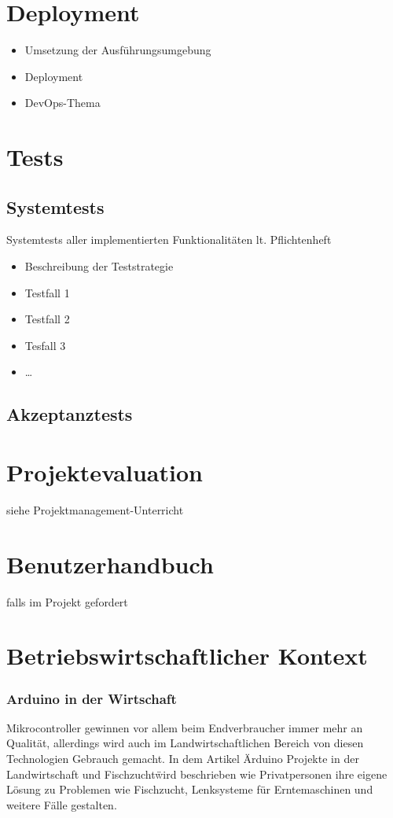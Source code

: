 \chapter{Deployment}
\begin{itemize}
	\item Umsetzung der Ausführungsumgebung
	\item Deployment
	\item DevOps-Thema
\end{itemize}

\chapter{Tests}

\section{Systemtests} 
Systemtests aller implementierten Funktionalitäten lt. Pflichtenheft
\begin{itemize}
	\item Beschreibung der Teststrategie
	\item Testfall 1
	\item Testfall 2
	\item Tesfall 3
	\item …
\end{itemize}

\section{Akzeptanztests}

\chapter{Projektevaluation}
siehe Projektmanagement-Unterricht

\chapter{Benutzerhandbuch} 
falls im Projekt gefordert

\newpage
\chapter{Betriebswirtschaftlicher Kontext}


\def \currentAuthor {Kevin Glatz}
\subsection{Arduino in der Wirtschaft}
Mikrocontroller gewinnen vor allem beim Endverbraucher immer mehr an Qualität, allerdings wird auch im Landwirtschaftlichen Bereich von diesen Technologien Gebrauch gemacht. In dem Artikel \"Arduino Projekte in der Landwirtschaft und Fischzucht\" wird beschrieben wie Privatpersonen ihre eigene Lösung zu Problemen wie Fischzucht, Lenksysteme für Erntemaschinen und weitere Fälle gestalten. 
\cite{ArdAgra}

